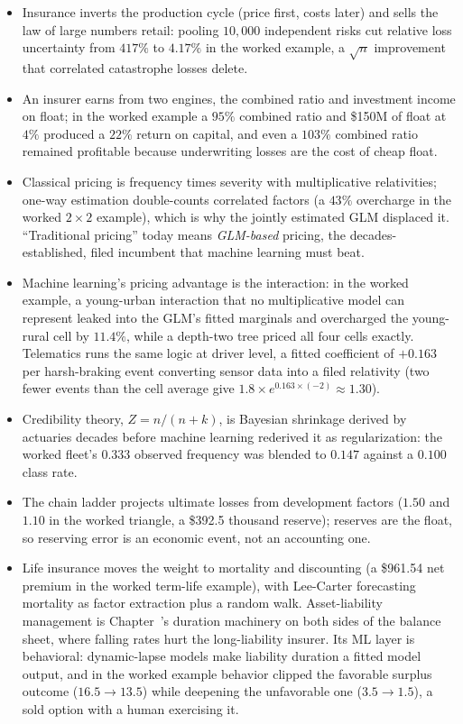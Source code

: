 \documentclass[../ai_in_finance]{subfiles}
\begin{document}
\begin{itemize}
\item Insurance inverts the production cycle (price first, costs later) and sells the law of large numbers retail: pooling $10{,}000$ independent risks cut relative loss uncertainty from $417\%$ to $4.17\%$ in the worked example, a $\sqrt{n}$ improvement that correlated catastrophe losses delete.
\item An insurer earns from two engines, the combined ratio and investment income on float; in the worked example a $95\%$ combined ratio and \$150M of float at $4\%$ produced a $22\%$ return on capital, and even a $103\%$ combined ratio remained profitable because underwriting losses are the cost of cheap float.
\item Classical pricing is frequency times severity with multiplicative relativities; one-way estimation double-counts correlated factors (a $43\%$ overcharge in the worked $2\times2$ example), which is why the jointly estimated GLM displaced it. ``Traditional pricing'' today means \emph{GLM-based} pricing, the decades-established, filed incumbent that machine learning must beat.
\item Machine learning's pricing advantage is the interaction: in the worked example, a young-urban interaction that no multiplicative model can represent leaked into the GLM's fitted marginals and overcharged the young-rural cell by $11.4\%$, while a depth-two tree priced all four cells exactly. Telematics runs the same logic at driver level, a fitted coefficient of $+0.163$ per harsh-braking event converting sensor data into a filed relativity (two fewer events than the cell average give $1.8 \times e^{0.163 \times (-2)} \approx 1.30$).
\item Credibility theory, $Z = n/(n+k)$, is Bayesian shrinkage derived by actuaries decades before machine learning rederived it as regularization: the worked fleet's $0.333$ observed frequency was blended to $0.147$ against a $0.100$ class rate.
\item The chain ladder projects ultimate losses from development factors ($1.50$ and $1.10$ in the worked triangle, a \$392.5 thousand reserve); reserves are the float, so reserving error is an economic event, not an accounting one.
\item Life insurance moves the weight to mortality and discounting (a \$961.54 net premium in the worked term-life example), with Lee-Carter forecasting mortality as factor extraction plus a random walk. Asset-liability management is Chapter~'s duration machinery on both sides of the balance sheet, where falling rates hurt the long-liability insurer. Its ML layer is behavioral: dynamic-lapse models make liability duration a fitted model output, and in the worked example behavior clipped the favorable surplus outcome ($16.5 \to 13.5$) while deepening the unfavorable one ($3.5 \to 1.5$), a sold option with a human exercising it.

\end{itemize}
\end{document}
